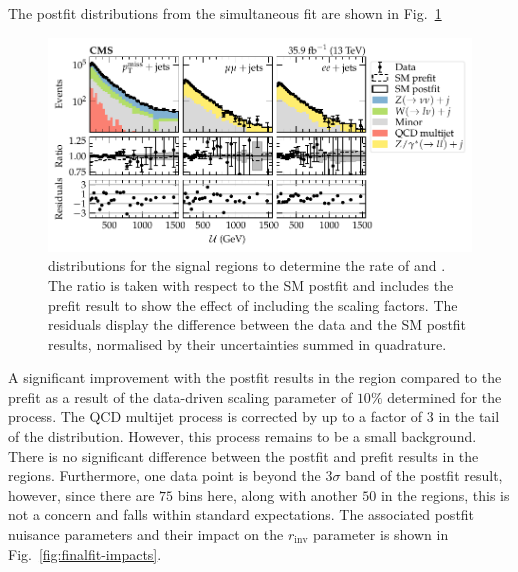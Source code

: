 The postfit distributions from the simultaneous fit are shown in Fig.~\ref{fig:finalfit-postfit}
%
\begin{figure}
    \centering
    \includegraphics{chapters/043_results/images/finalfit-postfit.pdf}
    \caption[Recoil distributions after a fit to the data between the signal and control regions.]{
        \recoil distributions for the signal regions to determine the rate of \IZvvj and \IZllj. The ratio is taken with respect to the SM postfit and includes the prefit result to show the effect of including the scaling factors. The residuals display the difference between the data and the SM postfit results, normalised by their uncertainties summed in quadrature.
    }
    \label{fig:finalfit-postfit}
\end{figure}
%
A significant improvement with the postfit results in the \metplusjets region compared to the prefit as a result of the data-driven scaling parameter of $10\%$ determined for the \IWlvj process. The QCD multijet process is corrected by up to a factor of $3$ in the tail of the \recoil distribution.  However, this process remains to be a small background. There is no significant difference between the postfit and prefit results in the \diellplusjets regions. Furthermore, one data point is beyond the $3\sigma$ band of the postfit result, however, since there are $75$ bins here, along with another $50$ in the \ellplusjets regions, this is not a concern and falls within standard expectations. The associated postfit nuisance parameters and their impact on the $r_{\mathrm{inv}}$ parameter is shown in Fig.~\ref{fig:finalfit-impacts}.
%
